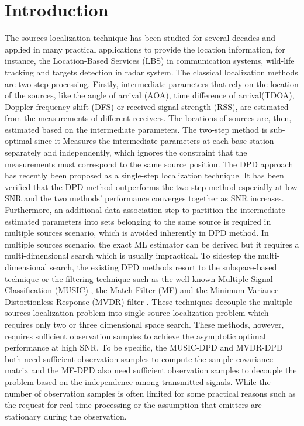 \documentclass[review]{elsarticle}
\begin{document}
\section{Introduction}
The sources localization technique has been studied for several decades and applied in many practical applications to provide the location information, for instance, the Location-Based Services (LBS) in communication systems, wild-life tracking and targets detection in radar system. The classical localization methods are two-step processing. Firstly, intermediate parameters that rely on the location of the sources, like the angle of arrival (AOA), time difference of arrival(TDOA), Doppler frequency shift (DFS) or received signal strength (RSS), are estimated from the measurements of different receivers. The locations of sources are, then, estimated based on the intermediate parameters. The two-step method is sub-optimal since it Measures the intermediate parameters at each base station separately and independently, which ignores the constraint that the measurements must correspond to the same source position. The DPD approach has recently been proposed as a single-step localization technique. It has been verified that the DPD method outperforms the two-step method especially at low SNR and the two methods' performance converges together as SNR increases. Furthermore, an additional data association step to partition the intermediate estimated parameters into sets belonging to the same source is required in multiple sources scenario, which is avoided inherently in DPD method. In multiple sources scenario, the exact ML estimator can be derived but it requires a multi-dimensional search which is usually impractical. To sidestep the multi-dimensional search, the existing DPD methods resort to the subspace-based technique or the filtering technique such as the well-known Multiple Signal Classification (MUSIC) \cite{DPD2005}, the Match Filter (MF) \cite{2004Direct} and the Minimum Variance Distortionless Response (MVDR) filter \cite{Tirer2015High}. These techniques decouple the multiple sources localization problem into single source localization problem which requires only two or three dimensional space search. These methods, however, requires sufficient observation samples to achieve the asymptotic optimal performance at high SNR. To be specific, the MUSIC-DPD \cite{DPD2005} and MVDR-DPD \cite{Tirer2015High} both need sufficient observation samples to compute the sample covariance matrix and the MF-DPD \cite{2004Direct} also need sufficient observation samples to decouple the problem based on the independence among transmitted signals. While the number of observation samples is often limited for some practical reasons such as the request for real-time processing or the assumption that emitters are stationary during the observation. 
\end{document}
